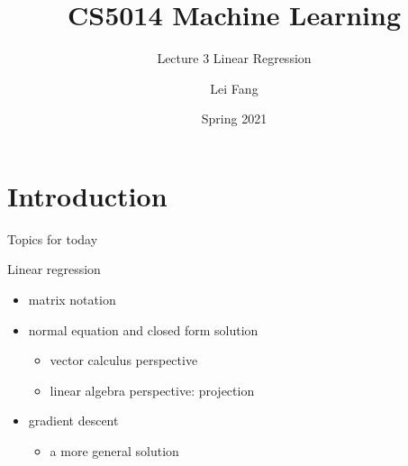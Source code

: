 \documentclass[ignorenonframetext,]{beamer}
\title{CS5014 Machine Learning}
\subtitle{Lecture 3 Linear Regression}
\author{Lei Fang}
\date{Spring 2021}
\providecommand{\tightlist}{%
  \setlength{\itemsep}{0pt}\setlength{\parskip}{0pt}}
\begin{document}
\frame{\titlepage}

\hypertarget{introduction}{%
\section{Introduction}\label{introduction}}

\begin{frame}{Topics for today}
\protect\hypertarget{topics-for-today}{}

Linear regression

\begin{itemize}
\tightlist
\item
  matrix notation
\item
  normal equation and closed form solution

  \begin{itemize}
  \tightlist
  \item
    vector calculus perspective
  \item
    linear algebra perspective: projection
  \end{itemize}
\item
  gradient descent

  \begin{itemize}
  \tightlist
  \item
    a more general solution
  \end{itemize}
\end{itemize}

\end{frame}
\end{document}
